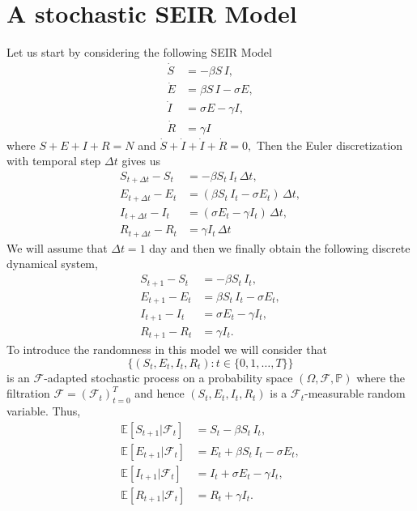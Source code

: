 \documentclass[12pt]{article}\usepackage[]{graphicx}\usepackage[]{color}
\begin{document}
\section{A stochastic SEIR Model}

Let us start by considering the following SEIR Model
\begin{align}
\dot{S} & = - \beta S \,I, \label{bPSEIR1}\\
\dot{E} & = \beta S \,I - \sigma E, \label{bPSEIR2} \\
\dot{I} & = \sigma E - \gamma I, \label{bPSEIR3}\\
\dot{R} & = \gamma I  \label{bPSEIR4}
\end{align}
where $S+E+I+R = N$ and $\dot{S}+\dot{I}+\dot{I}+\dot{R} =0,$ Then
the Euler discretization with temporal step $\Delta t$ gives us
\begin{align}
S_{t+\Delta t}-S_t & =  - \beta S_t \,I_t \, \Delta t, \label{ccPSEIR1}\\
E_{t+\Delta t}-E_t & = (\beta S_t \,I_t - \sigma E_t)\, \Delta t, \label{ccPSEIR2} \\
I_{t+\Delta t}-I_t & =  (\sigma E_t - \gamma I_t)\, \Delta t, \label{ccPSEIR3} \\ 
R_{t+\Delta t}-R_t & = \gamma I_t \, \Delta t \label{ccPSEIR4}
\end{align}
We will assume that $\Delta t = 1$ day and then we finally obtain the following discrete dynamical system,
\begin{align}
S_{t+1}-S_t & =  - \beta S_t \,I_t , \label{cPSEIR1}\\
E_{t+1}-E_t & = \beta S_t \,I_t - \sigma E_t, \label{cPSEIR2} \\
I_{t+1}-I_t & =  \sigma E_t - \gamma I_t, \label{cPSEIR3} \\ 
R_{t+1}-R_t & = \gamma I_t. \label{cPSEIR4}
\end{align}
To introduce the randomness in this model we will consider that
$$\{(S_t,E_t,I_t,R_t) : t \in \{0,1,\ldots,T\}\}$$ is an $\mathcal{F}$-adapted stochastic process on a probability
space $(\Omega,\mathcal{F},\mathbb{P})$ where the filtration $\mathcal{F}=(\mathcal{F}_t)_{t=0}^T$ and hence 
$(S_t,E_t,I_t,R_t)$ is a $\mathcal{F}_t$-measurable random variable. Thus,
\begin{align}
\mathbb{E}[S_{t+1}|\mathcal{F}_t] & =  S_t - \beta S_t \,I_t , \label{dPSEIR1}\\
\mathbb{E}[E_{t+1}|\mathcal{F}_t] & = E_t + \beta S_t \,I_t - \sigma E_t, \label{dPSEIR2} \\
\mathbb{E}[I_{t+1}|\mathcal{F}_t] & = I_t + \sigma E_t - \gamma I_t, \label{dPSEIR3} \\ 
\mathbb{E}[R_{t+1} |\mathcal{F}_t] & =R_t + \gamma I_t. \label{dPSEIR4}
\end{align}
\end{document}
